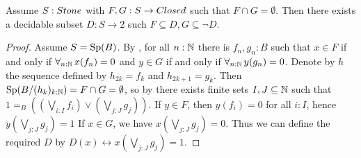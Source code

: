 \begin{lemma}\label{StoneSeperated}
  Assume $S:\Stone $ with $F,G:S \to \Closed$ such that $F\cap G = \emptyset$. 
  Then there exists a decidable subset $D:S \to 2$ such $F\subseteq D, G \subseteq \neg D$. 
\end{lemma}
\begin{proof}
  Assume $S = \operatorname{Sp}(B)$. 
  By , for all $n:\mathbb{N}$ there is $f_n,g_n:B$ such that 
  $x\in F$ if and only if $\forall_{n:\mathbb{N}}\, x(f_n) = 0$ and 
  $y\in G$ if and only if $\forall_{n:\mathbb{N}}\, y(g_n) = 0$.
%
  Denote by $h$ the sequence defined by $h_{2k}=f_k$ and $h_{2k+1}=g_k$.
Then $\operatorname{Sp}(B/(h_k)_{k:\mathbb{N}}) = F \cap G=\emptyset$, so by 
%
  there exists finite sets $I,J\subseteq \mathbb{N} $ such that 
  $1 =_B ((\bigvee_{i:I}  f_i) \vee (\bigvee_{j:J}  g_j)).$
%
  If $y\in F$, then $y(f_i) = 0$ for all $i:I$, hence
  $y(\bigvee_{j:J} g_j) = 1 $
 If $x\in G$, we have 
  $x(\bigvee_{j:J} g_j) = 0$. 
  Thus we can define the required $D$ by 
  $D(x) \leftrightarrow x(\bigvee_{j:J} g_j) = 1$.
\end{proof} 

